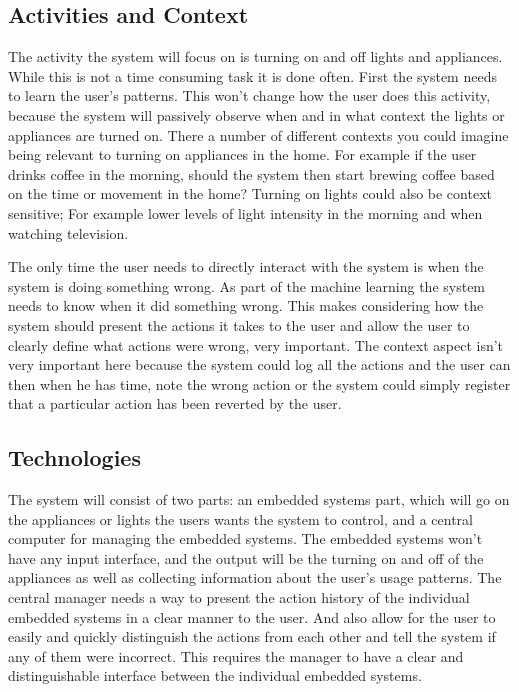 \subsection{Activities and Context}
The activity the system will focus on is turning on and off lights and
appliances. While this is not a time consuming task it is done often. First the
system needs to learn the user's patterns. This won't change how the user does
this activity, because the system will passively observe when and in what
context the lights or appliances are turned on. There a number of different
contexts you could imagine being relevant to turning on appliances in the home.
For example if the user drinks coffee in the morning, should the system then
start brewing coffee based on the time or movement in the home? Turning on
lights could also be context sensitive; For example lower levels of light
intensity in the morning and when watching television.

The only time the user needs to directly interact with the system is when the
system is doing something wrong. As part of the machine learning the system
needs to know when it did something wrong. This makes considering how the system
should present the actions it takes to the user and allow the user to clearly
define what actions were wrong, very important. The context aspect isn't very
important here because the system could log all the actions and the user can
then when he has time, note the wrong action or the system could simply register
that a particular action has been reverted by the user.

\subsection{Technologies}
The system will consist of two parts: an embedded systems part, which will go on
the appliances or lights the users wants the system to control, and a central
computer for managing the embedded systems. The embedded systems won't have any
input interface, and the output will be the turning on and off of the appliances
as well as collecting information about the user's usage patterns. The central manager needs a way to present the action history of the individual embedded systems in a clear manner to the user. And also allow for the user to easily and quickly distinguish the actions from each other and tell the system if any of them were incorrect. This requires the manager to have a clear and distinguishable interface between the individual embedded systems.